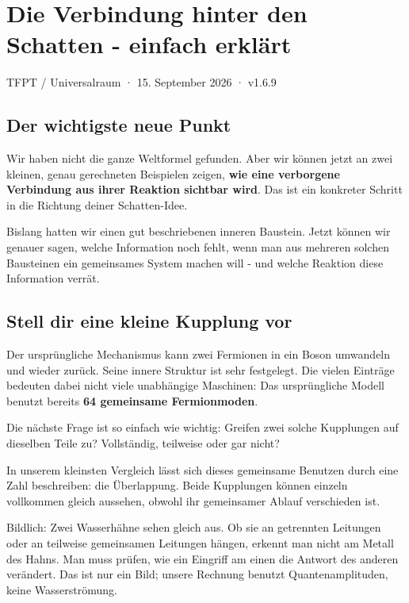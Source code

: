 \documentclass[
  ngerman,
  10pt,
  a4paper,
]{article}
\author{}
\date{}
\begin{document}
\section{Die Verbindung hinter den Schatten - einfach
erklärt}\label{die-verbindung-hinter-den-schatten---einfach-erkluxe4rt}

TFPT / Universalraum · 15. September 2026 · v1.6.9

\subsection{Der wichtigste neue Punkt}\label{der-wichtigste-neue-punkt}

Wir haben nicht die ganze Weltformel gefunden. Aber wir können jetzt an
zwei kleinen, genau gerechneten Beispielen zeigen, \textbf{wie eine
verborgene Verbindung aus ihrer Reaktion sichtbar wird}. Das ist ein
konkreter Schritt in die Richtung deiner Schatten-Idee.

Bislang hatten wir einen gut beschriebenen inneren Baustein. Jetzt
können wir genauer sagen, welche Information noch fehlt, wenn man aus
mehreren solchen Bausteinen ein gemeinsames System machen will - und
welche Reaktion diese Information verrät.

\subsection{Stell dir eine kleine Kupplung
vor}\label{stell-dir-eine-kleine-kupplung-vor}

Der ursprüngliche Mechanismus kann zwei Fermionen in ein Boson umwandeln
und wieder zurück. Seine innere Struktur ist sehr festgelegt. Die vielen
Einträge bedeuten dabei nicht viele unabhängige Maschinen: Das
ursprüngliche Modell benutzt bereits \textbf{64 gemeinsame
Fermionmoden}.

Die nächste Frage ist so einfach wie wichtig: Greifen zwei solche
Kupplungen auf dieselben Teile zu? Vollständig, teilweise oder gar
nicht?

In unserem kleinsten Vergleich lässt sich dieses gemeinsame Benutzen
durch eine Zahl beschreiben: die Überlappung. Beide Kupplungen können
einzeln vollkommen gleich aussehen, obwohl ihr gemeinsamer Ablauf
verschieden ist.

Bildlich: Zwei Wasserhähne sehen gleich aus. Ob sie an getrennten
Leitungen oder an teilweise gemeinsamen Leitungen hängen, erkennt man
nicht am Metall des Hahns. Man muss prüfen, wie ein Eingriff am einen
die Antwort des anderen verändert. Das ist nur ein Bild; unsere Rechnung
benutzt Quantenamplituden, keine Wasserströmung.
\end{document}

